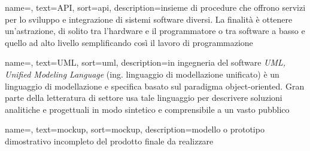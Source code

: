 \renewcommand{\acronymname}{Acronimi e abbreviazioni}












{
    name=,
    text=API,
    sort=api,
    description={insieme di procedure che offrono servizi per lo sviluppo e integrazione di sistemi software diversi. La finalità è ottenere un'astrazione, di solito tra l'hardware e il programmatore o tra software a basso e quello ad alto livello semplificando così il lavoro di programmazione}
}

{
    name=,
    text=UML,
    sort=uml,
    description={in ingegneria del software \emph{UML, Unified Modeling Language} (ing. linguaggio di modellazione unificato) è un linguaggio di modellazione e specifica basato sul paradigma object-oriented. Gran parte della letteratura di settore usa tale linguaggio per descrivere soluzioni analitiche e progettuali in modo sintetico e comprensibile a un vasto pubblico}
}

{
    name=,
    text=mockup,
    sort=mockup,
    description={modello o prototipo dimostrativo incompleto del prodotto finale da realizzare}
}

